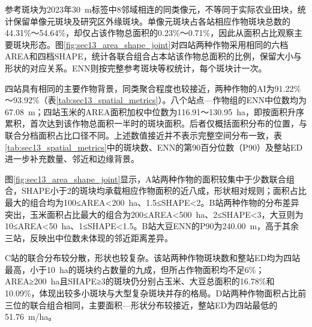 参考斑块为2023年30~m标签中8邻域相连的同类像元，不等同于实际农业田块，统计保留单像元斑块及研究区外缘斑块。单像元斑块占各站相应作物斑块总数的44.31\%～54.64\%，却仅占该作物总面积的0.23\%～0.71\%，因此从面积占比观察主要斑块形态。图\ref{fig:sec13_area_shape_joint}对四站两种作物采用相同的六档AREA和四档SHAPE，统计各联合组合占本站该作物总面积的比例，保留大小与形状的对应关系。ENN则按完整参考斑块等权统计，每个斑块计一次。

四站具有相同的主要作物背景，同类聚合程度也较接近，两种作物的AI为91.22\%～93.92\%（表\ref{tab:sec13_spatial_metrics}）。八个站点—作物组的ENN中位数均为67.08~m；四站玉米的AREA面积加权中位数为116.91～130.95~ha，即按面积升序累积，首次达到该作物总面积一半时的斑块面积。后者仅概括面积分布的位置，与联合分档面积占比口径不同。上述数值接近并不表示完整空间分布一致，表\ref{tab:sec13_spatial_metrics}中的斑块数、ENN的第90百分位数（P90）及整站ED进一步补充数量、邻近和边缘背景。

图\ref{fig:sec13_area_shape_joint}显示，A站两种作物的面积较集中于少数联合组合，SHAPE小于2的斑块均承载相应作物面积的近八成，形状相对规则；面积占比最大的组合均为100≤AREA<200~ha、1.5≤SHAPE<2。B站两种作物的分布差异突出，玉米面积占比最大的组合为200≤AREA<500~ha、2≤SHAPE<3，大豆则为10≤AREA<50~ha、1≤SHAPE<1.5。B站大豆ENN的P90为240.00~m，高于其余三站，反映出中位数未体现的邻近距离差异。

C站的联合分布较分散，形状也较复杂。该站两种作物斑块数和整站ED均为四站最高，小于10~ha的斑块约占数量的九成，但所占作物面积均不足6\%；AREA≥200~ha且SHAPE≥3的斑块仍分别占玉米、大豆总面积的16.78\%和10.09\%，体现出较多小斑块与大型复杂斑块并存的格局。D站两种作物面积占比前三位的联合组合相同，主要面积—形状分布较接近，整站ED为四站最低的51.76~m/ha。

